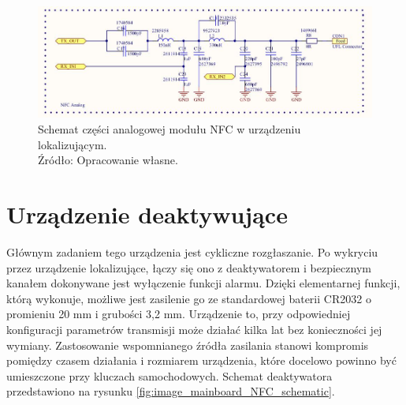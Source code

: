 \begin{figure}[H]
	\centering
	\includegraphics[width=15cm]{img/schematics/mainboard_NFC_analog.jpg}
	\caption{Schemat części analogowej modułu NFC w urządzeniu lokalizującym. \\ Źródło: Opracowanie własne.}
	\label{fig:image_mainboard_NFC_analog}
\end{figure}


\clearpage
\section{Urządzenie deaktywujące}

Głównym zadaniem tego urządzenia jest cykliczne rozgłaszanie. Po wykryciu przez urządzenie lokalizujące, łączy się ono z deaktywatorem i bezpiecznym kanałem dokonywane jest wyłączenie funkcji alarmu. Dzięki elementarnej funkcji, którą wykonuje, możliwe jest zasilenie go ze standardowej baterii CR2032 o promieniu 20 mm i grubości 3,2 mm. Urządzenie to, przy odpowiedniej konfiguracji parametrów transmisji może działać kilka lat bez konieczności jej wymiany. Zastosowanie wspomnianego źródła zasilania stanowi kompromis pomiędzy czasem działania i rozmiarem urządzenia, które docelowo powinno być umieszczone przy kluczach samochodowych. Schemat deaktywatora przedstawiono na rysunku \ref{fig:image_mainboard_NFC_schematic}.

